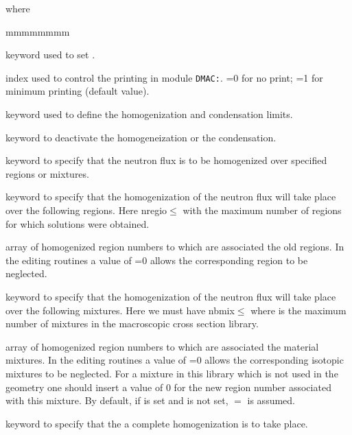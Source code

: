 \noindent where
\begin{ListeDeDescription}{mmmmmmmm}

\item[\moc{EDIT}] keyword used to set .

\item[\dusa{iprint}] index used to control the printing in module {\tt DMAC:}. =0 for no print; =1 for minimum printing (default value).

\item[\moc{RATE}] keyword used to define the homogenization and condensation limits.

\item[\moc{NONE}] keyword to deactivate the homogeneization or the condensation. 

\item[\moc{MERG}] keyword to specify that the neutron flux is to be
homogenized over specified regions or mixtures. 

\item[\moc{REGI}] keyword to specify that the homogenization of the neutron
flux will take place over the following regions. Here nregio$\le$
with  the maximum number of regions for which solutions were
obtained.

\item[\dusa{iregm}] array of homogenized region numbers to which are
associated the old regions. In the editing routines a value of =0
allows the corresponding region to be neglected. 

\item[\moc{MIX}] keyword to specify that the homogenization of the neutron
flux will take place over the following mixtures. Here
we must have nbmix$\le$ where  is the maximum number
of mixtures in the macroscopic cross section library.  

\item[\dusa{imixm}] array of homogenized region numbers to which are
associated the material mixtures. In the editing routines a value of
=0 allows the corresponding isotopic mixtures to be neglected. For a mixture in this
library which is not used in the geometry one should insert a value of 0 for the
new region number associated with this mixture. By default, if  is set and
 is not set, $=$ is assumed.

\item[\moc{COMP}] keyword to specify that the a complete homogenization is to
take place.


\end{ListeDeDescription}
